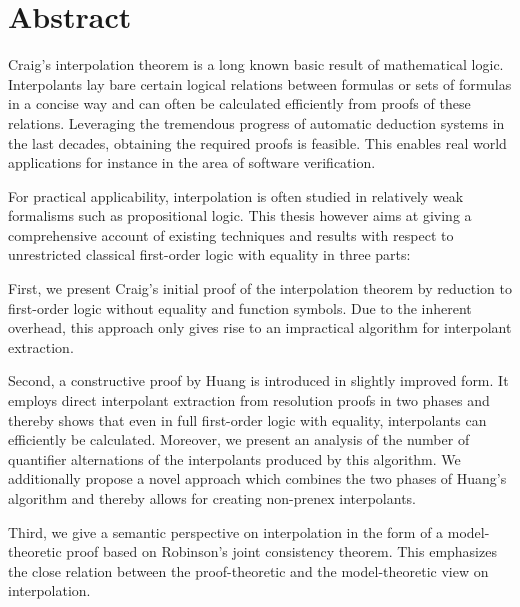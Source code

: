 \chapter*{Abstract}

Craig's interpolation theorem is a long known basic result of mathematical logic.
Interpolants lay bare certain logical relations between formulas or sets of formulas in a concise way and can often be calculated efficiently from proofs of these relations.
Leveraging the tremendous
progress of automatic deduction systems in the last decades, obtaining the required proofs
is feasible. 
This enables real world applications for instance in the area of software verification.

For practical applicability, interpolation is often studied in relatively weak formalisms such as propositional logic.
This thesis however aims at giving a comprehensive account of existing techniques and results with respect to unrestricted classical first-order logic with equality in three parts:

First, we present Craig's initial proof of the interpolation theorem by reduction to first-order logic without equality and function symbols.
Due to the inherent overhead,
this approach only gives rise to an impractical algorithm for interpolant extraction.

Second, a constructive proof by Huang is introduced in slightly improved form.
It employs direct interpolant extraction from resolution proofs in two phases 
and thereby
shows that even in full first-order logic with equality, interpolants can efficiently be calculated.
Moreover, we present an analysis of the number of quantifier alternations of the interpolants produced by this algorithm.
We additionally propose a novel approach which combines the two phases of Huang's algorithm and thereby allows for creating non-prenex interpolants.

Third, we give a semantic perspective on interpolation in the form of a model-theoretic proof based on Robinson's joint consistency theorem.
This emphasizes the close relation between the proof-theoretic and the model-theoretic view on interpolation.
